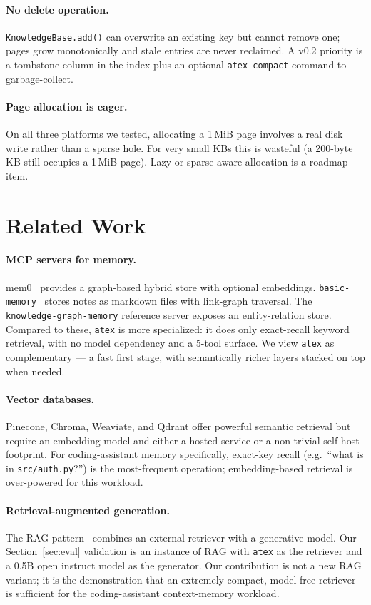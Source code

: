 \documentclass[10pt,letterpaper]{article}
\begin{document}
\paragraph{No delete operation.} \texttt{KnowledgeBase.add()} can overwrite an existing key but cannot remove one; pages grow monotonically and stale entries are never reclaimed. A v0.2 priority is a tombstone column in the index plus an optional \texttt{atex compact} command to garbage-collect.

\paragraph{Page allocation is eager.} On all three platforms we tested, allocating a 1\,MiB page involves a real disk write rather than a sparse hole. For very small KBs this is wasteful (a 200-byte KB still occupies a 1\,MiB page). Lazy or sparse-aware allocation is a roadmap item.

\section{Related Work}
\label{sec:related}

\paragraph{MCP servers for memory.} mem0~\cite{mem0} provides a graph-based hybrid store with optional embeddings. \texttt{basic-memory}~\cite{basicmemory} stores notes as markdown files with link-graph traversal. The \texttt{knowledge-graph-memory} reference server exposes an entity-relation store. Compared to these, \texttt{atex} is more specialized: it does only exact-recall keyword retrieval, with no model dependency and a 5-tool surface. We view \texttt{atex} as complementary --- a fast first stage, with semantically richer layers stacked on top when needed.

\paragraph{Vector databases.} Pinecone, Chroma, Weaviate, and Qdrant offer powerful semantic retrieval but require an embedding model and either a hosted service or a non-trivial self-host footprint. For coding-assistant memory specifically, exact-key recall (e.g.\ ``what is in \texttt{src/auth.py}?'') is the most-frequent operation; embedding-based retrieval is over-powered for this workload.

\paragraph{Retrieval-augmented generation.} The RAG pattern~\cite{lewis2020rag} combines an external retriever with a generative model. Our Section~\ref{sec:eval} validation is an instance of RAG with \texttt{atex} as the retriever and a 0.5B open instruct model as the generator. Our contribution is not a new RAG variant; it is the demonstration that an extremely compact, model-free retriever is sufficient for the coding-assistant context-memory workload.
\end{document}
